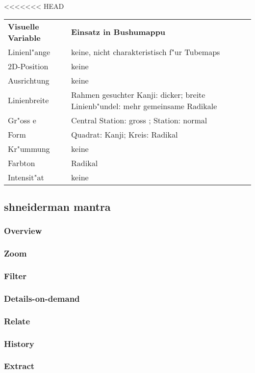 \begin{table}[h]
<<<<<<< HEAD\begin{tabular}{ll}

\textbf{Visuelle Variable} & \textbf{Einsatz in Bushumappu}                                                          \\
Linienl"ange       & keine, nicht charakteristisch f"ur Tubemaps                                    \\
2D-Position       & keine                                                                          \\
Ausrichtung       & keine                                                                          \\
Linienbreite      & Rahmen gesuchter Kanji: dicker; breite Linienb"undel: mehr gemeinsame Radikale \\
Gr"oss e             & Central Station: gross ; Station: normal                                       \\
Form              & Quadrat: Kanji; Kreis: Radikal                                                 \\
Kr"ummung         & keine                                                                          \\
Farbton           & Radikal                                                                        \\
Intensit"at       & keine                                                                          \\
\end{tabular}
\end{table}

\subsection{shneiderman mantra}
\subsubsection{Overview}
\subsubsection{Zoom}
\subsubsection{Filter}
\subsubsection{Details-on-demand}
\subsubsection{Relate}
\subsubsection{History}
\subsubsection{Extract}
